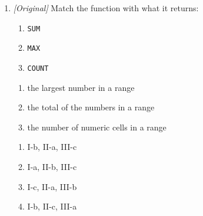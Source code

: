 \begin{enumerate}[label=\textbf{Q\arabic*.}, leftmargin=*]
\begin{enumerate}[label=\Roman*.]
    \item \texttt{COUNT} counts only numeric cells, whereas \texttt{COUNTA}
      counts all non-empty cells.
    \item In a numeric comparison, a blank cell is treated as zero.
    \item A formula must always begin with the equal sign (\texttt{=}).
  \end{enumerate}
  \begin{enumerate}[label=\Alph*.]
    \item I and II only
    \item II and III only
    \item I and III only
    \item I, II, and III
  \end{enumerate}
\item \textit{[Original]} Match the function with what it returns:
  \begin{enumerate}[label=\Roman*.]
    \item \texttt{SUM}
    \item \texttt{MAX}
    \item \texttt{COUNT}
  \end{enumerate}
  \begin{enumerate}[label=(\alph*)]
    \item the largest number in a range
    \item the total of the numbers in a range
    \item the number of numeric cells in a range
  \end{enumerate}
  \begin{enumerate}[label=\Alph*.]
    \item I-b, II-a, III-c
    \item I-a, II-b, III-c
    \item I-c, II-a, III-b
    \item I-b, II-c, III-a
  \end{enumerate}


\end{enumerate}
